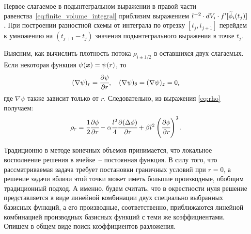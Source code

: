 Первое слагаемое в подынтегральном выражении в правой части равенства~\eqref{eq:finite_volume_integral} приблизим выражением $l^{-2} \cdot dV_i \cdot f'[{\widetilde{\phi}}_i(t_j)]$. При построении разностной схемы от интеграла по отрезку $[t_j, t_{j + 1}]$ перейдем к умножению на $(t_{j + 1} - t_j)$ значения подынтегрального выражения в точке $t_j$.

Выясним, как вычислить плотность потока $\rho_{i \pm 1/2}$ в оставшихся двух слагаемых. Если некоторая функция $\psi({\boldsymbol{x}}) = \psi(r)$, то
$$(\nabla \psi)_r = \cfrac{\partial \psi}{\partial r}, \quad (\nabla \psi)_\theta = (\nabla \psi)_z = 0 {\text{,}}$$
где $\nabla \psi$ также зависит только от $r$. Следовательно, из выражения \eqref{eq:rho} получаем:
\begin{equation}
	\rho_r = \cfrac{1}{2} \cfrac{\partial \phi}{\partial r} - \alpha \cfrac{l^2}{4} \cfrac{\partial (\Delta \phi)}{\partial r} + \beta l^2 \left( \cfrac{\partial \phi}{\partial r} \right)^3 {\text{.}}
	\label{eq:finite_volumes_density}
\end{equation}

Традиционно в методе конечных объемов принимается, что локальное восполнение решения в ячейке~-- постоянная функция. В силу того, что рассматриваемая задача требует постановки граничных условий при $r = 0$, а решение задачи вблизи этой точки может иметь большие производные, обобщим традиционный подход. А именно, будем считать, что в окрестности нуля решение представляется в виде линейной комбинации двух специально выбранных базисных функций, а его производные, соответственно, приближаются линейной комбинацией производных базисных функций с теми же коэффициентами. Опишем в общем виде поиск коэффициентов разложения.

